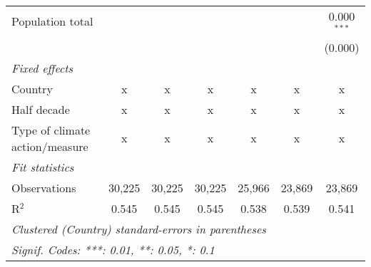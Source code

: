 \begin{tabular}{lcccccc}
   Population total                                                      &         &              &              &               &               & 0.000$^{***}$\\   
                                                                         &         &              &              &               &               & (0.000)\\   
   \emph{Fixed effects}\\
   Country                                                               & x       & x            & x            & x             & x             & x\\  
   Half decade                                                           & x       & x            & x            & x             & x             & x\\  
   Type of climate action/measure                                        & x       & x            & x            & x             & x             & x\\  
   \midrule \emph{Fit statistics}\\
   Observations                                                          & 30,225  & 30,225       & 30,225       & 25,966        & 23,869        & 23,869\\  
   R$^2$                                                                 & 0.545   & 0.545        & 0.545        & 0.538         & 0.539         & 0.541\\  
   \midrule
   \multicolumn{7}{l}{\emph{Clustered (Country) standard-errors in parentheses}}\\
   \multicolumn{7}{l}{\emph{Signif. Codes: ***: 0.01, **: 0.05, *: 0.1}}\\
\end{tabular}
\par\endgroup


